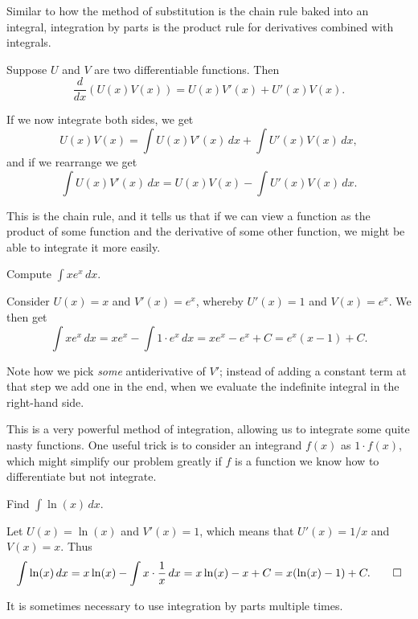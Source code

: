 

Similar to how the method of substitution  is the chain rule baked into an integral, integration by parts is the product rule for derivatives combined with integrals.

Suppose $U$ and $V$ are two differentiable functions.
Then
\[
	\frac{d}{d x} (U(x) V(x)) = U(x) V'(x) + U'(x) V(x).
\]

\noindent
If we now integrate both sides, we get
\[
	U(x) V(x) = \int U(x) V'(x) \, d x + \int U'(x) V(x) \, d x,
\]
and if we rearrange we get
\[
	\int U(x) V'(x) \, d x = U(x) V(x) - \int U'(x) V(x) \, d x.
\]

\noindent
This is the chain rule, and it tells us that if we can view a function as the product of some function and the derivative of some other function, we might be able to integrate it more easily.

\begin{example}
	Compute $\int x e^x \, d x$.

	Consider $U(x) = x$ and $V'(x) = e^x$, whereby $U'(x) = 1$ and $V(x) = e^x$.
	We then get
	\[
		\int x e^x \, d x = x e^x - \int 1 \cdot e^x \, d x = x e^x - e^x + C = e^x (x - 1) + C.
	\]

	\noindent
	Note how we pick \emph{some} antiderivative of $V'$; instead of adding a constant term at that step we add one in the end, when we evaluate the indefinite integral in the right-hand side.
\end{example}

\noindent
This is a very powerful method of integration, allowing us to integrate some quite nasty functions.
One useful trick is to consider an integrand $f(x)$ as $1 \cdot f(x)$, which might simplify our problem greatly if $f$ is a function we know how to differentiate but not integrate.

\begin{example}
	Find $\int \ln(x) \, d x$.

	Let $U(x) = \ln(x)$ and $V'(x) = 1$, which means that $U'(x) = 1/x$ and $V(x) = x$.
	Thus
	\[
		\int \ln(x) \, d x = x \ln(x) - \int x \cdot \frac{1}{x} \, d x = x \ln(x) - x + C = x (\ln(x) -1) + C. \qedhere
	\]
\end{example}

\noindent
It is sometimes necessary to use integration by parts multiple times.

